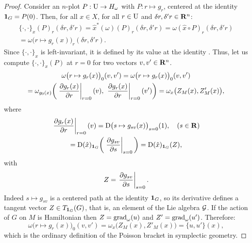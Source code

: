 \begin{proof}
  Consider an $n$-plot $P : \mathrm{U} \to H_\omega$ with $P : r \mapsto g_r$,
  centered at the identity ${\mathbf{1}}_G = P(0)$.
  Then,
  for all $x \in X$,
  for all $r \in \mathrm{U}$ and $\delta r, \delta'r \in \mathbf{R}^n$:
  \begin{multline*}
    \{\cdot, \cdot\}_x(P)_r(\delta r, \delta'r)  = \hat x^*(\omega)(P)_r(\delta r, \delta'r)  = \omega(\hat x \circ P)_r(\delta r, \delta'r) \\
    = \omega\bigl(r \mapsto g_r(x)\bigr)_r(\delta r, \delta'r).
  \end{multline*}
  Since $\{\cdot, \cdot\}_x$ is left-invariant, it is defined by its value at the identity \cite[\textsection\,6.40, 7.18]{PIZ13}.
  Thus,
  let us compute $\{\cdot, \cdot\}_x(P)$ at $r = 0$ for two vectors $v, v' \in \mathbf{R}^n$.
  \begin{multline*}
    \omega\bigl(r \mapsto g_r(x)\bigr)_0(v, v') = \omega\bigl(r \mapsto g_r(x)\bigr)_0(v, v') \\
     = \omega_{g_0(x)}\bigg( \left.{\partial g_r(x) \over \partial r}\right|_{r=0}(v),\; \left.{\partial g_r(x) \over \partial r}\right|_{r=0}(v') \bigg)
     = \omega_x\bigl(Z_M(x), Z'_M(x)\bigr),
  \end{multline*}
  where
  \begin{multline*}
    \left.{\partial g_r(x) \over \partial r}\right|_{r=0}(v) = \operatorname{D}\bigl(s \mapsto g_{sv}(x)\bigr)_{s=0}(1), \quad (s \in \mathbf{R})  \\
     = \operatorname{D}(\hat x)_{{\mathbf{1}}_G}\bigg(\left.{\partial g_{sv} \over \partial s}\right|_{s=0}\bigg)
     = \operatorname{D}(\hat x)_{{\mathbf{1}}_G}(Z),
  \end{multline*}
  with
  $$
    Z = \left.{\partial g_{sv} \over \partial s}\right|_{s=0}.
  $$
  Indeed $s \mapsto g_{sv}$ is a centered path at the identity ${\mathbf{1}}_G$,
  so its derivative defines a tangent vector $Z \in T_{{\mathbf{1}}_G}(G)$,
  that is, an element of the Lie algebra $\mathcal{G}$.
  If the action of $G$ on $M$ is Hamiltonian then $Z = \operatorname{grad}_\omega(u)$ and $Z' = \operatorname{grad}_\omega(u')$.
  Therefore:
  $$
    \omega\bigl(r \mapsto g_r(x)\bigr)_0(v, v') = \omega_x\bigl(Z_M(x), Z'_M(x)\bigr) = \{u,u'\}(x),
  $$
  which is the ordinary definition of the Poisson bracket in symplectic geometry.
\end{proof}


